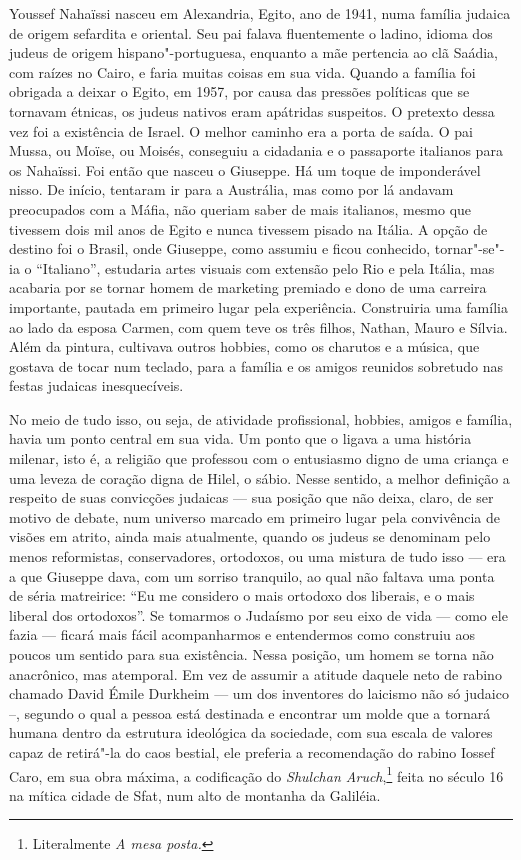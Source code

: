 Youssef Nahaïssi nasceu em Alexandria, Egito, ano de 1941, numa família
judaica de origem sefardita e oriental. Seu pai falava fluentemente o
ladino, idioma dos judeus de origem hispano"-portuguesa, enquanto a mãe pertencia
ao clã Saádia, com raízes no Cairo, e faria muitas coisas em sua vida.
Quando a família foi obrigada a deixar o Egito, em 1957, por causa das
pressões políticas que se tornavam étnicas, os judeus nativos eram
apátridas suspeitos. O pretexto dessa vez foi a existência de Israel. O
melhor caminho era a porta de saída. O pai Mussa, ou Moïse, ou Moisés,
conseguiu a cidadania e o passaporte italianos para os Nahaïssi. Foi
então que nasceu o Giuseppe. Há um toque de imponderável nisso. De
início, tentaram ir para a Austrália, mas como por lá andavam
preocupados com a Máfia, não queriam saber de mais italianos, mesmo que
tivessem dois mil anos de Egito e nunca tivessem
pisado na Itália. A opção de destino foi o Brasil, onde Giuseppe, como
assumiu e ficou conhecido, tornar"-se"-ia o ``Italiano'', estudaria artes
visuais com extensão pelo Rio e pela Itália, mas acabaria por se tornar
homem de marketing premiado e dono de uma carreira importante, pautada
em primeiro lugar pela experiência. Construiria uma família ao lado da
esposa Carmen, com quem teve os três filhos, Nathan, Mauro e Sílvia.
Além da pintura, cultivava outros hobbies, como os charutos e a música,
que gostava de tocar num teclado, para a família e os amigos reunidos
sobretudo nas festas judaicas inesquecíveis.

No meio de tudo isso, ou seja, de atividade profissional, hobbies, amigos e
família, havia um ponto central em sua vida. Um ponto que o ligava a
uma história milenar, isto é, a religião que professou com o
entusiasmo digno de uma criança e uma leveza de coração digna de Hilel,
o sábio. Nesse sentido, a melhor definição a respeito de suas convicções
judaicas --- sua posição que não deixa, claro, de ser motivo de debate, num
universo marcado em primeiro lugar pela convivência de visões em atrito,
ainda mais atualmente, quando os judeus se denominam
pelo menos reformistas, conservadores, ortodoxos, ou uma mistura de tudo
isso --- era a que Giuseppe dava, com um sorriso tranquilo, ao qual não faltava uma
ponta de séria matreirice: ``Eu me considero o mais ortodoxo dos
liberais, e o mais liberal dos ortodoxos''. Se tomarmos o Judaísmo por
seu eixo de vida --- como ele fazia --- ficará mais fácil acompanharmos e
entendermos como construiu aos poucos um sentido para sua existência.
Nessa posição, um homem se torna não anacrônico, mas atemporal. Em vez
de assumir a atitude daquele neto de rabino chamado David Émile Durkheim
--- um dos inventores do laicismo não só judaico --, segundo o qual a
pessoa está destinada e encontrar um molde que a tornará humana dentro
da estrutura ideológica da sociedade, com sua escala de valores capaz de
retirá"-la do caos bestial, ele preferia a recomendação do rabino Iossef
Caro, em sua obra máxima, a codificação do \emph{Shulchan Aruch},\footnote{Literalmente \emph{A mesa posta.}} feita no século 16 na mítica cidade de Sfat, num alto de montanha da Galiléia.


